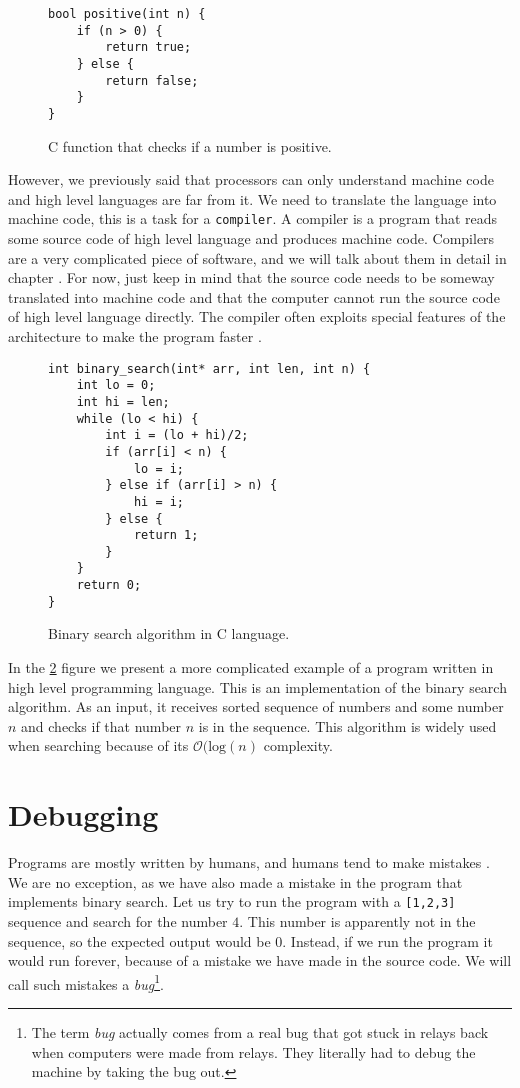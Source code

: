 \begin{figure}\label{fig:c-positive}
\begin{verbatim}
bool positive(int n) {
    if (n > 0) {
        return true;
    } else {
        return false;
    }
}
\end{verbatim}
\caption{C function that checks if a number is positive.}
\end{figure}

However, we previously said that processors can only understand machine code
and high level languages are far from it. We need to translate the language
into machine code, this is a task for a \texttt{compiler}. A compiler is a
program that reads some source code of high level language and produces machine
code. Compilers are a very complicated piece of software, and we will talk
about them in detail in chapter . For now,
just keep in mind that the source code needs to be someway translated into
machine code and that the computer cannot run the source code of high level
language directly. The compiler often exploits special features of the
architecture to make the program faster .

\begin{figure}[H]\label{fig:binary-search}
    \begin{verbatim}
int binary_search(int* arr, int len, int n) {
    int lo = 0;
    int hi = len;
    while (lo < hi) {
        int i = (lo + hi)/2;
        if (arr[i] < n) {
            lo = i;
        } else if (arr[i] > n) {
            hi = i;
        } else {
            return 1;
        }
    }
    return 0;
}
    \end{verbatim}
    \caption{Binary search algorithm in C language.}
\end{figure}

In the \ref{fig:binary-search} figure we present a more complicated example of
a program written in high level programming language. This is an implementation
of the binary search algorithm. As an input, it receives sorted sequence of
numbers and some number $n$ and checks if that number $n$ is in the sequence.
This algorithm is widely used when searching because of its
$\mathcal{O}(\text{log}(n)$ complexity.

\section{Debugging}
Programs are mostly written by humans, and humans tend to make mistakes
\cite{human-error}. We are no exception, as we have also made a mistake in the
program that implements binary search. Let us try to run the program with a
\texttt{[1,2,3]} sequence and search for the number $4$. This number is
apparently not in the sequence, so the expected output would be $0$. Instead,
if we run the program it would run forever, because of a mistake we have made
in the source code. We will call such mistakes a \textit{bug}\footnote{The term
\textit{bug} actually comes from a real bug that got stuck in relays back when
computers were made from relays. They literally had to debug the machine by
taking the bug out.}.

